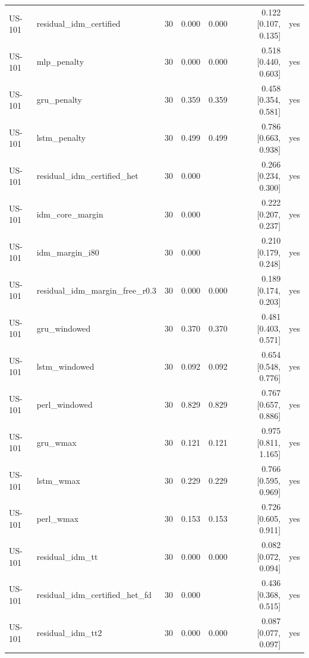 \begin{table}[htbp]
\begin{tabular}{llrrrrl}
US-101 & residual\_idm\_certified & 30 & 0.000 & 0.000 & 0.122 [0.107, 0.135] & yes \\
US-101 & mlp\_penalty & 30 & 0.000 & 0.000 & 0.518 [0.440, 0.603] & yes \\
US-101 & gru\_penalty & 30 & 0.359 & 0.359 & 0.458 [0.354, 0.581] & yes \\
US-101 & lstm\_penalty & 30 & 0.499 & 0.499 & 0.786 [0.663, 0.938] & yes \\
US-101 & residual\_idm\_certified\_het & 30 & 0.000 &  & 0.266 [0.234, 0.300] & yes \\
US-101 & idm\_core\_margin & 30 & 0.000 &  & 0.222 [0.207, 0.237] & yes \\
US-101 & idm\_margin\_i80 & 30 & 0.000 &  & 0.210 [0.179, 0.248] & yes \\
US-101 & residual\_idm\_margin\_free\_r0.3 & 30 & 0.000 & 0.000 & 0.189 [0.174, 0.203] & yes \\
US-101 & gru\_windowed & 30 & 0.370 & 0.370 & 0.481 [0.403, 0.571] & yes \\
US-101 & lstm\_windowed & 30 & 0.092 & 0.092 & 0.654 [0.548, 0.776] & yes \\
US-101 & perl\_windowed & 30 & 0.829 & 0.829 & 0.767 [0.657, 0.886] & yes \\
US-101 & gru\_wmax & 30 & 0.121 & 0.121 & 0.975 [0.811, 1.165] & yes \\
US-101 & lstm\_wmax & 30 & 0.229 & 0.229 & 0.766 [0.595, 0.969] & yes \\
US-101 & perl\_wmax & 30 & 0.153 & 0.153 & 0.726 [0.605, 0.911] & yes \\
US-101 & residual\_idm\_tt & 30 & 0.000 & 0.000 & 0.082 [0.072, 0.094] & yes \\
US-101 & residual\_idm\_certified\_het\_fd & 30 & 0.000 &  & 0.436 [0.368, 0.515] & yes \\
US-101 & residual\_idm\_tt2 & 30 & 0.000 & 0.000 & 0.087 [0.077, 0.097] & yes \\
\bottomrule
\end{tabular}
\end{table}
